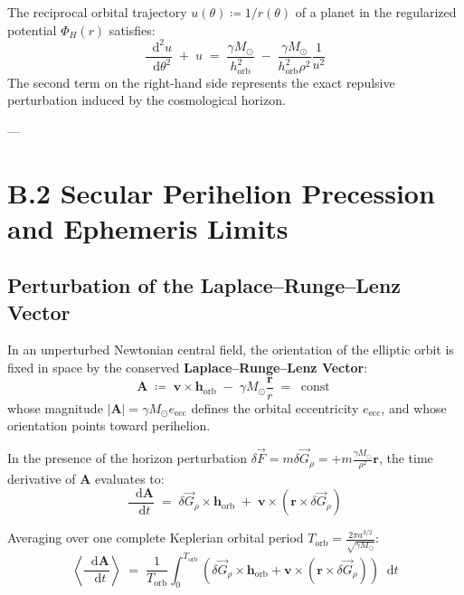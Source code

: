 \documentclass[
    12pt,
    a4paper,
    headings=normal,
    twoside=false,
    open=any,
    parskip=half
]{scrbook}
\newcommand{\diff}{\mathop{}\!\mathrm{d}}
\begin{document}
\begin{phystheorem}\label{thm:appB_modified_binet_equation}
The reciprocal orbital trajectory $u(\theta) \coloneqq 1/r(\theta)$ of a planet in the regularized potential $\Phi_H(r)$ satisfies:
\begin{equation}
\boxed{\frac{\diff^2 u}{\diff\theta^2} \;+\; u \;=\; \frac{\gamma M_\odot}{h_{\text{orb}}^2} \;-\; \frac{\gamma M_\odot}{h_{\text{orb}}^2 \rho^2} \frac{1}{u^2}}
\label{eq:appB_binet_master}
\end{equation}
The second term on the right-hand side represents the exact repulsive perturbation induced by the cosmological horizon.
\end{phystheorem}

---

\section{B.2 Secular Perihelion Precession and Ephemeris Limits}
\label{sec:appB_perihelion_precession}

\subsection{Perturbation of the Laplace--Runge--Lenz Vector}

In an unperturbed Newtonian central field, the orientation of the elliptic orbit is fixed in space by the conserved \textbf{Laplace--Runge--Lenz Vector}:
\begin{equation}
\mathbf{A} \;\coloneqq\; \mathbf{v} \times \mathbf{h}_{\text{orb}} \;-\; \gamma M_\odot \frac{\mathbf{r}}{r} \;=\; \operatorname{const}
\end{equation}
whose magnitude $|\mathbf{A}| = \gamma M_\odot e_{\text{ecc}}$ defines the orbital eccentricity $e_{\text{ecc}}$, and whose orientation points toward perihelion.

In the presence of the horizon perturbation $\delta\vec{F} = m \delta\vec{G}_\rho = +m \frac{\gamma M_\odot}{\rho^2}\mathbf{r}$, the time derivative of $\mathbf{A}$ evaluates to:
\begin{equation}
\frac{\diff \mathbf{A}}{\diff t} \;=\; \delta\vec{G}_\rho \times \mathbf{h}_{\text{orb}} \;+\; \mathbf{v} \times (\mathbf{r} \times \delta\vec{G}_\rho)
\end{equation}

Averaging over one complete Keplerian orbital period $T_{\text{orb}} = \frac{2\pi a^{3/2}}{\sqrt{\gamma M_\odot}}$:
\begin{equation}
\left\langle \frac{\diff \mathbf{A}}{\diff t} \right\rangle \;=\; \frac{1}{T_{\text{orb}}} \int_0^{T_{\text{orb}}} \left( \delta\vec{G}_\rho \times \mathbf{h}_{\text{orb}} + \mathbf{v} \times (\mathbf{r} \times \delta\vec{G}_\rho) \right) \diff t
\end{equation}
\end{document}
